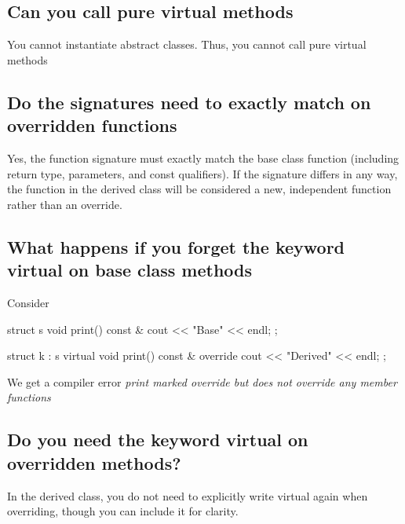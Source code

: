 \documentclass{report}
\begin{document}
    \bigbreak \noindent 
    \subsection{Can you call pure virtual methods}
    \bigbreak \noindent 
    You cannot instantiate abstract classes. Thus, you cannot call pure virtual methods

    \bigbreak \noindent 
    \subsection{Do the signatures need to exactly match on overridden functions}
    \bigbreak \noindent 
    Yes, the function signature must exactly match the base class function (including return type, parameters, and const qualifiers). If the signature differs in any way, the function in the derived class will be considered a new, independent function rather than an override.

    \bigbreak \noindent 
    \subsection{What happens if you forget the keyword virtual on base class methods}
    \bigbreak \noindent 
    Consider
    \bigbreak \noindent 
    \begin{cppcode}
        struct s{
            void print() const & {cout << "Base" << endl;}
        };

        struct k : s{
            virtual void print() const & override {cout << "Derived" << endl;}
        };
    \end{cppcode}
    \bigbreak \noindent 
    We get a compiler error \textit{print marked override but does not override any member functions}

    \bigbreak \noindent 
    \subsection{Do you need the keyword virtual on overridden methods?}
    \bigbreak \noindent 
    In the derived class, you do not need to explicitly write virtual again when overriding, though you can include it for clarity.

    \bigbreak \noindent 
\end{document}
